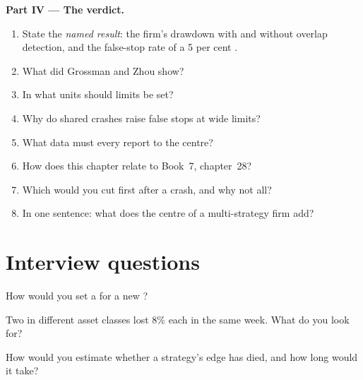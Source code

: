 \begin{problem}
\medskip\noindent\textbf{Part IV --- The verdict.}
\begin{enumerate}[resume]
\item State the \emph{named result}: the firm's drawdown with and without overlap detection, and the false-stop rate of a 5 per cent .
\item What did Grossman and Zhou show?
\item In what units should limits be set?
\item Why do shared crashes raise false stops at wide limits?
\item What data must every  report to the centre?
\item How does this chapter relate to Book~7, chapter~28?
\item Which  would you cut first after a crash, and why not all?
\item In one sentence: what does the centre of a multi-strategy firm add?
\end{enumerate}
\end{problem}

\section{Interview questions}

\begin{interviewq}\label{iq:s1:running-a-multi-strategy-book:1}
How would you set a  for a new ?
\end{interviewq}

\begin{interviewq}\label{iq:s1:running-a-multi-strategy-book:2}
Two  in different asset classes lost 8\% each in the same week. What do you look for?
\end{interviewq}

\begin{interviewq}\label{iq:s1:running-a-multi-strategy-book:3}
How would you estimate whether a strategy's edge has died, and how long would it take?
\end{interviewq}

